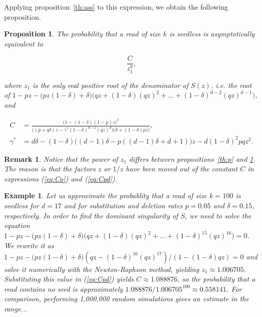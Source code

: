 \documentclass{article}
\newtheorem{example}{Example}
\newtheorem{proposition}{Proposition}
\newtheorem{remark}{Remark}
\begin{document}
Applying proposition~\ref{th:ass} to this expression, we obtain the
following proposition.

\begin{proposition}
\label{th:pd}
The probability that a read of size $k$ is seedless is asymptotically
equivalent to

\begin{equation*}
\frac{C}{z_1^k},
\end{equation*}

\noindent
where $z_1$ is the only real positive root of the denominator of $S(z)$,
\textit{i.e.} the root of $1-pz - \big(pz(1-\delta) +
\delta\big)\big(qz+(1-\delta)(qz)^2 + \ldots +
(1-\delta)^{d-2}(qz)^{d-1}\big)$, and

\begin{equation}
\label{eq:Cpd}
\begin{split}
C &=
\frac{ \big(1-(1-\delta)(1-p)z\big)^2 }
{ \big((p+q\delta)z  -\gamma^*(1-\delta)^{d-1}(qz)^d \big)
\big(\delta+(1-\delta)pz\big) }, \\
\gamma^* &= d\delta -(1-\delta)\big((d-1)\delta-p((d-1)\delta+d+1)\big)z
- d(1-\delta)^2pqz^2.
\end{split}
\end{equation}
\end{proposition}

\begin{remark}
Notice that the power of $z_1$ differs between propositions~\ref{th:p} and
\ref{th:pd}. The reason is that the factors $z$ or $1/z$ have been moved
out of the constant $C$ in expressions (\ref{eq:Cp}) and (\ref{eq:Cpd}).
\end{remark}

\begin{example}
Let us approximate the probablity that a read of size $k = 100$ is
seedless for $d=17$ and for substitution and deletion rates $p = 0.05$ and
$\delta = 0.15$, respectively. In order to find the dominant singularity of
$S$, we need to solve the equation $1-pz - \big(pz(1-\delta) +
\delta\big)\big(qz+(1-\delta)(qz)^2 + \ldots +
(1-\delta)^{15}(qz)^{16}\big) = 0$. We rewrite it as $1-pz -
\big(pz(1-\delta)+\delta\big)(qz-(1-\delta)^{16}(qz)^{17}) /
(1-(1-\delta)qz) = 0$ and solve it numerically with the Newton-Raphson
method, yielding $z_1 \approx 1.006705$. Substituting this value in
(\ref{eq:Cpd}) yields $C \approx 1.088876$, so the probability that a read
contains no seed is approximately $1.088876 / 1.006705^{100} \approx
0.558141$. For comparison, performing 1,000,000 random simulations gives
an estimate in the range...
\end{example}
\end{document}
